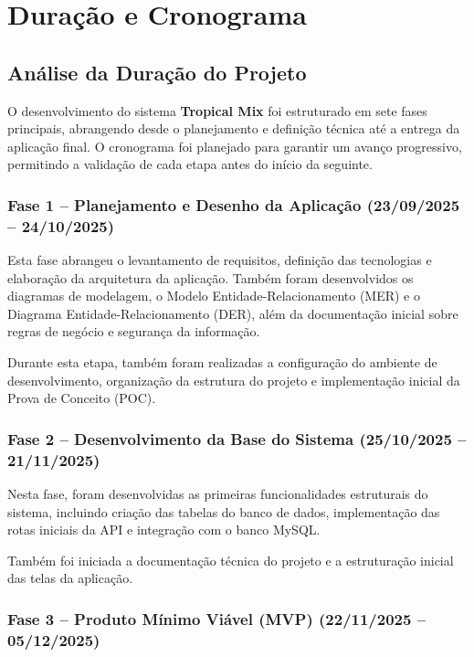 \newpage
\section{Duração e Cronograma}

\subsection{Análise da Duração do Projeto}

O desenvolvimento do sistema \textbf{Tropical Mix} foi estruturado em sete fases principais, abrangendo desde o planejamento e definição técnica até a entrega da aplicação final. O cronograma foi planejado para garantir um avanço progressivo, permitindo a validação de cada etapa antes do início da seguinte.  

\subsubsection{Fase 1 – Planejamento e Desenho da Aplicação (23/09/2025 – 24/10/2025)}

Esta fase abrangeu o levantamento de requisitos, definição das tecnologias e elaboração da arquitetura da aplicação. Também foram desenvolvidos os diagramas de modelagem, o Modelo Entidade-Relacionamento (MER) e o Diagrama Entidade-Relacionamento (DER), além da documentação inicial sobre regras de negócio e segurança da informação.  

Durante esta etapa, também foram realizadas a configuração do ambiente de desenvolvimento, organização da estrutura do projeto e implementação inicial da Prova de Conceito (POC).  

\subsubsection{Fase 2 – Desenvolvimento da Base do Sistema (25/10/2025 – 21/11/2025)}

Nesta fase, foram desenvolvidas as primeiras funcionalidades estruturais do sistema, incluindo criação das tabelas do banco de dados, implementação das rotas iniciais da API e integração com o banco MySQL.  

Também foi iniciada a documentação técnica do projeto e a estruturação inicial das telas da aplicação.  

\subsubsection{Fase 3 – Produto Mínimo Viável (MVP) (22/11/2025 – 05/12/2025)}

